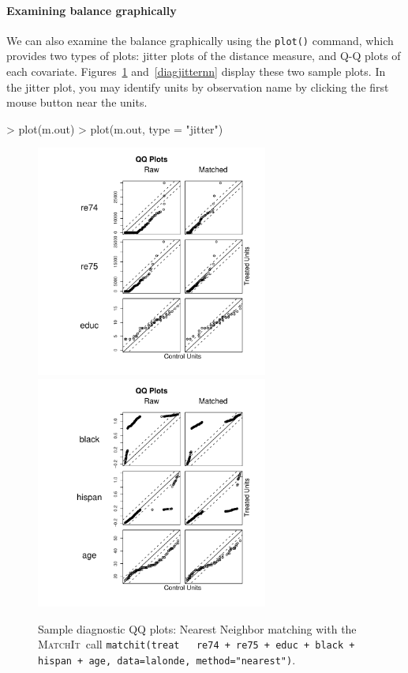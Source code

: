 \documentclass[oneside,letterpaper,titlepage]{article}
\newcommand{\MatchIt}{\textsc{MatchIt}}
\begin{document}
\paragraph{Examining balance graphically}

We can also examine the balance graphically using the \texttt{plot()}
command, which provides two types of plots: jitter plots of the
distance measure, and Q-Q plots of each covariate.
Figures~\ref{diagqqnn} and~\ref{diagjitternn} display these two sample
plots.  In the jitter plot, you may identify units by observation name
by clicking the first mouse button near the units.
\begin{Schunk}
\begin{Sinput}
> plot(m.out)
> plot(m.out, type = "jitter")
\end{Sinput}
\end{Schunk}

\begin{figure}[tbp]
  \begin{center}
    \includegraphics[width=3in, height=3in]{figs/qqplotnn}
    \includegraphics[width=3in, height=3in]{figs/qqplotnn2} 
    \hfill
    \caption{Sample diagnostic QQ plots: Nearest Neighbor matching
      with the \MatchIt\ call \texttt{matchit(treat ~ re74 + re75 + educ
        + black + hispan + age, data=lalonde, method="nearest")}.}
    \label{diagqqnn}
  \end{center}
\end{figure}
\end{document}
